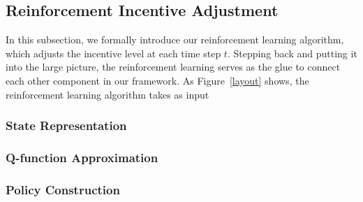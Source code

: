 \subsection{Reinforcement Incentive Adjustment}
In this subsection, we formally introduce our reinforcement learning algorithm, which adjusts the incentive level at each time step $t$. Stepping back and putting it into the large picture, the reinforcement learning serves as the glue to connect each other component in our framework. As Figure~\ref{layout} shows, the reinforcement learning algorithm takes as input 

\subsubsection{State Representation}

\subsubsection{Q-function Approximation}

\subsubsection{Policy Construction}